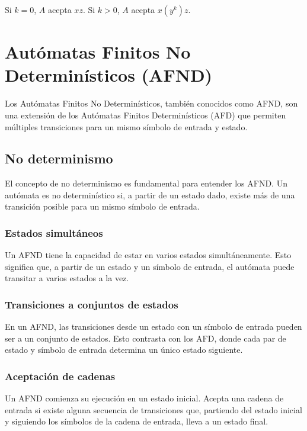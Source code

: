 \documentclass[11pt]{article}
\begin{document}
    Si $k = 0$, $A$ acepta $xz$. Si $k > 0$, $A$ acepta $x(y^k)z$.


    \newpage


    \section{Autómatas Finitos No Determinísticos (AFND)}

    Los Autómatas Finitos No Determinísticos, también conocidos como AFND, son una extensión de los Autómatas Finitos Determinísticos (AFD) que permiten múltiples transiciones para un mismo símbolo de entrada y estado.

    \subsection{No determinismo}

    El concepto de no determinismo es fundamental para entender los AFND. Un autómata es no determinístico si, a partir de un estado dado, existe más de una transición posible para un mismo símbolo de entrada.

    \subsubsection{Estados simultáneos}

    Un AFND tiene la capacidad de estar en varios estados simultáneamente. Esto significa que, a partir de un estado y un símbolo de entrada, el autómata puede transitar a varios estados a la vez.

    \subsubsection{Transiciones a conjuntos de estados}

    En un AFND, las transiciones desde un estado con un símbolo de entrada pueden ser a un conjunto de estados. Esto contrasta con los AFD, donde cada par de estado y símbolo de entrada determina un único estado siguiente.

    \subsubsection{Aceptación de cadenas}

    Un AFND comienza su ejecución en un estado inicial. Acepta una cadena de entrada si existe alguna secuencia de transiciones que, partiendo del estado inicial y siguiendo los símbolos de la cadena de entrada, lleva a un estado final.
\end{document}
